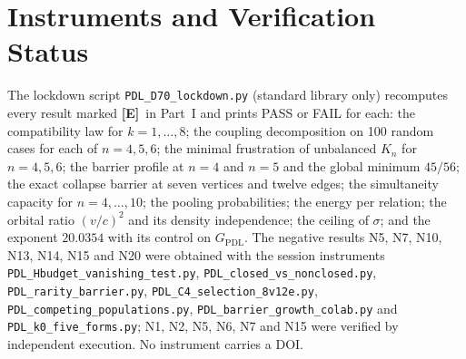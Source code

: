 \documentclass[11pt,a4paper]{article}
\theoremstyle{plain}
\theoremstyle{definition}
\theoremstyle{remark}
\newcommand{\statE}{\textbf{[E]}}
\begin{document}
\appendix

\section{Instruments and Verification Status}
\label{app:instruments}

The lockdown script \texttt{PDL\_D70\_lockdown.py} (standard library only) recomputes every result marked \statE\ in Part~I and prints PASS or FAIL for each: the compatibility law for $k=1,\dots,8$; the coupling decomposition on 100 random cases for each of $n=4,5,6$; the minimal frustration of unbalanced $K_n$ for $n=4,5,6$; the barrier profile at $n=4$ and $n=5$ and the global minimum $45/56$; the exact collapse barrier at seven vertices and twelve edges; the simultaneity capacity for $n=4,\dots,10$; the pooling probabilities; the energy per relation; the orbital ratio $(v/c)^2$ and its density independence; the ceiling of $\sigma$; and the exponent $20.0354$ with its control on $G_{\mathrm{PDL}}$. The negative results N5, N7, N10, N13, N14, N15 and N20 were obtained with the session instruments \texttt{PDL\_Hbudget\_vanishing\_test.py}, \texttt{PDL\_closed\_vs\_nonclosed.py}, \texttt{PDL\_rarity\_barrier.py}, \texttt{PDL\_C4\_selection\_8v12e.py}, \texttt{PDL\_competing\_populations.py}, \texttt{PDL\_barrier\_growth\_colab.py} and \texttt{PDL\_k0\_five\_forms.py}; N1, N2, N5, N6, N7 and N15 were verified by independent execution. No instrument carries a DOI.



\end{document}
